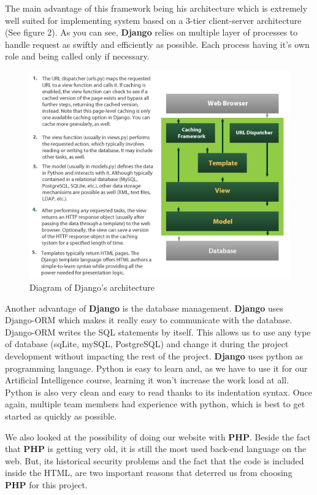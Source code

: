 The main advantage of this framework being his architecture which is extremely well suited for implementing system based on a 3-tier client-server architecture (See figure 2). As you can see, \textbf{Django} relies on multiple layer of processes to handle request as swiftly and efficiently as possible. Each process having it's own role and being called only if necessary.  \newline

\begin{figure}
	\centering
	\includegraphics[width=0.85\linewidth]{DjangoArchitecture.png}
	\caption{Diagram of Django's architecture}
	\label{fig:length_eight_mouse}
\end{figure}

Another advantage of \textbf{Django} is the database management. \textbf{Django} uses Django-ORM which makes it really easy to communicate with the database. Django-ORM writes the SQL statements by itself. This allows us to use any type of database (sqLite, mySQL, PostgreSQL) and change it during the project development without impacting the rest of the project.
\textbf{Django} uses python as programming language. Python is easy to learn and, as we have to use it for our Artificial Intelligence course, learning it won't increase the work load at all.
Python is also very clean and easy to read thanks to its indentation syntax. Once again, multiple team members had experience with python, which is best to get started as quickly as possible.\newline

We also looked at the possibility of doing our website with \textbf{PHP}. Beside the fact that \textbf{PHP} is getting very old, it is still the most used back-end language on the web. But, its historical security problems and the fact that the code is included inside the HTML, are two important reasons that deterred us from choosing \textbf{PHP} for this project.\newline

